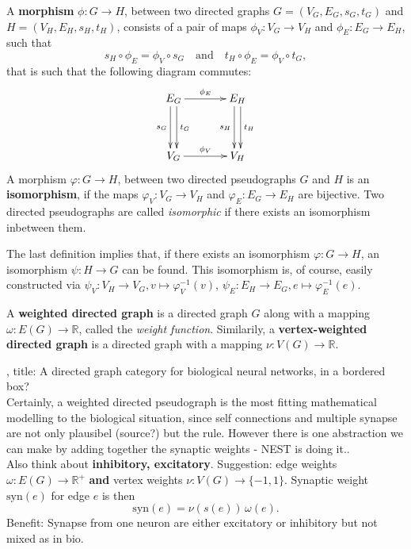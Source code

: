 A \textbf{morphism} $\phi: G \to H$, between two directed graphs
$G=(V_G,E_G,s_G,t_G)$ and $H=(V_H,E_H,s_H,t_H)$, consists of a pair of
maps $\phi_V: V_G \to V_H$ and $\phi_E: E_G \to E_H$, such that
\[
s_H \circ \phi_E = \phi_V \circ s_G \mathrm{\quad and \quad} t_H \circ
\phi_E = \phi_V \circ t_G,
\]
that is such that the following diagram commutes:
%
\begin{align*} 
  \xymatrix@+=1.3cm{E_G \ar^{t_G}@<0.66ex>[d] \ar_{s_G}@<-0.66ex>[d]
    \ar^{\phi_E}[r] & E_H \ar^{t_H}@<0.66ex>[d]
    \ar_{s_H}@<-0.66ex>[d]\\ V_G \ar^{\phi_V}[r] & V_H}
\end{align*}
%
A morphism $\varphi: G \to H$, between two directed pseudographs $G$
and $H$ is an \textbf{isomorphism}, if the maps $\varphi_V: V_G \to
V_H$ and $\varphi_E: E_G \to E_H$ are bijective. Two directed
pseudographs are called \textit{isomorphic} if there exists an
isomorphism inbetween them.

\begin{remark}
  The last definition implies that, if there exists an isomorphism
  $\varphi: G \to H$, an isomorphism $\psi: H \to G$ can be
  found. This isomorphism is, of course, easily constructed via
  $\psi_V: V_H \to V_G, v \mapsto \varphi_V^{-1}(v)$, $\psi_E: E_H \to
  E_G, e \mapsto \varphi_E^{-1}(e)$.
\end{remark}

\begin{definition}
  A \textbf{weighted directed graph} is a directed graph $G$ along
  with a mapping $\omega: E(G) \to \mathbb{R}$, called the
  \textit{weight function}. Similarily, a \textbf{vertex-weighted
    directed graph} is a directed graph with a mapping $\nu: V(G) \to
  \mathbb{R}$.
\end{definition}

\begin{remark} , title: A directed graph category
for biological neural networks, in a bordered box?\\ Certainly, a
weighted directed pseudograph is the most fitting mathematical
modelling to the biological situation, since self connections and
multiple synapse are not only plausibel (source?) but the
rule. However there is one abstraction we can make by adding together
the synaptic weights - NEST is doing it..\\ Also think about
\textbf{inhibitory, excitatory}. Suggestion: edge weights $\omega:
E(G) \to \mathbb{R}^{+}$ \textbf{and} vertex weights $\nu: V(G) \to
\{-1, 1\}$. Synaptic weight $\mathrm{syn}(e)$ for edge $e$ is
then \[\mathrm{syn}(e) = \nu(s(e))\,\omega(e).\] Benefit: Synapse from
one neuron are either excitatory or inhibitory but not mixed as in
bio.
\end{remark}


